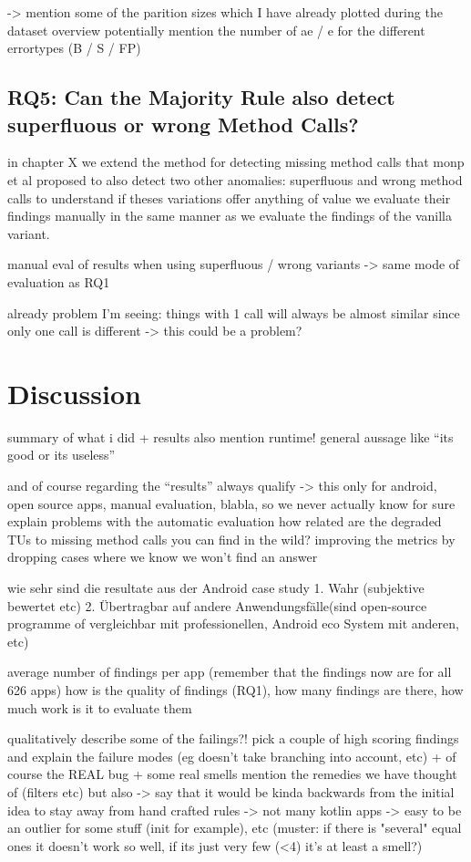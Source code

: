 -> mention some of the parition sizes which I have already plotted during the dataset overview
potentially mention the number of ae / e for the different errortypes (B / S / FP)

\subsection{RQ5: Can the Majority Rule also detect superfluous or wrong Method Calls?}

in chapter X we extend the method for detecting missing method calls that monp et al proposed to also detect two other anomalies:
superfluous and wrong method calls
to understand if theses variations offer anything of value we evaluate their findings manually in the same manner as we evaluate the findings of the vanilla variant.

manual eval of results when using superfluous / wrong variants
-> same mode of evaluation as RQ1

already problem I'm seeing: things with 1 call will always be almost similar since only one call is different
 -> this could be a problem?

\section{Discussion}

summary of what i did + results
also mention runtime!
general aussage like ``its good or its useless''

and of course regarding the ``results'' always qualify -> this only for android, open source apps, manual evaluation, blabla, so we never actually know for sure
explain problems with the automatic evaluation
how related are the degraded TUs to missing method calls you can find in the wild?
improving the metrics by dropping cases where we know we won't find an answer

wie sehr sind die resultate aus der Android case study 1. Wahr (subjektive bewertet etc) 2. Übertragbar auf andere Anwendungsfälle(sind open-source programme of vergleichbar mit professionellen, Android eco System mit anderen, etc)

average number of findings per app (remember that the findings now are for all 626 apps)
how is the quality of findings (RQ1), how many findings are there, how much work is it to evaluate them

qualitatively describe some of the failings?! 
pick a couple of high scoring findings and explain the failure modes (eg doesn't take branching into account, etc)
+ of course the REAL bug + some real smells
mention the remedies we have thought of (filters etc) but also -> say that it would be kinda backwards from the initial idea to stay away from hand crafted rules
-> not many kotlin apps -> easy to be an outlier for some stuff (init for example), etc
(muster: if there is "several" equal ones it doesn't work so well, if its just very few (<4) it's at least a smell?)

